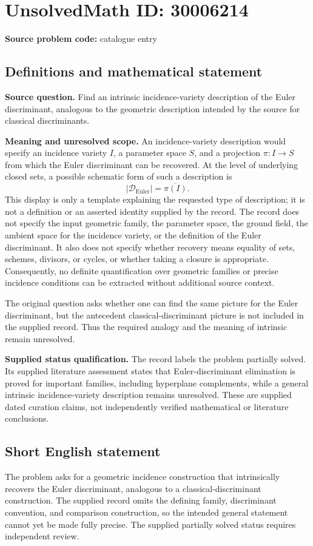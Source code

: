 \documentclass[11pt]{article}
\begin{document}
\section*{UnsolvedMath ID: 30006214}
\textbf{Source problem code:} catalogue entry
\subsection{Definitions and mathematical statement}
\textbf{Source question.} Find an intrinsic incidence-variety description of the Euler discriminant, analogous to the geometric description intended by the source for classical discriminants.

\textbf{Meaning and unresolved scope.} An incidence-variety description would specify an incidence variety \(I\), a parameter space \(S\), and a projection \(\pi\colon I\to S\) from which the Euler discriminant can be recovered. At the level of underlying closed sets, a possible schematic form of such a description is
\[
\lvert\mathcal D_{\mathrm{Euler}}\rvert=\overline{\pi(I)}.
\]
This display is only a template explaining the requested type of description; it is not a definition or an asserted identity supplied by the record. The record does not specify the input geometric family, the parameter space, the ground field, the ambient space for the incidence variety, or the definition of the Euler discriminant. It also does not specify whether recovery means equality of sets, schemes, divisors, or cycles, or whether taking a closure is appropriate. Consequently, no definite quantification over geometric families or precise incidence conditions can be extracted without additional source context.

The original question asks whether one can find the same picture for the Euler discriminant, but the antecedent classical-discriminant picture is not included in the supplied record. Thus the required analogy and the meaning of intrinsic remain unresolved.

\textbf{Supplied status qualification.} The record labels the problem partially solved. Its supplied literature assessment states that Euler-discriminant elimination is proved for important families, including hyperplane complements, while a general intrinsic incidence-variety description remains unresolved. These are supplied dated curation claims, not independently verified mathematical or literature conclusions.
\subsection{Short English statement}
The problem asks for a geometric incidence construction that intrinsically recovers the Euler discriminant, analogous to a classical-discriminant construction. The supplied record omits the defining family, discriminant convention, and comparison construction, so the intended general statement cannot yet be made fully precise. The supplied partially solved status requires independent review.
\end{document}
